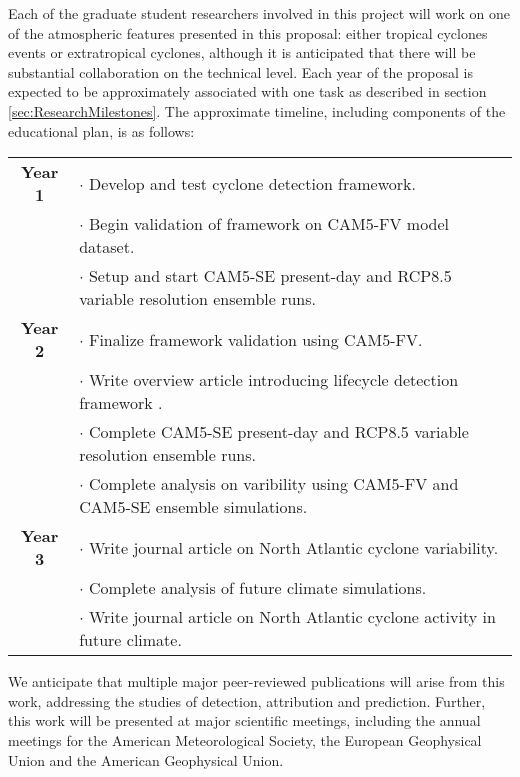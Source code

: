 \documentclass[11pt]{article}
\begin{document}
Each of the graduate student researchers involved in this project will work on one of the atmospheric features presented in this proposal: either tropical cyclones events or extratropical cyclones, although it is anticipated that there will be substantial collaboration on the technical level.  Each year of the proposal is expected to be approximately associated with one task as described in section \ref{sec:ResearchMilestones}.  The approximate timeline, including components of the educational plan, is as follows:

\begin{tabularx}{\textwidth}{cX}
\hline
\textbf{Year 1} & $\cdot$ Develop and test cyclone detection framework. \\
& $\cdot$ Begin validation of framework on CAM5-FV model dataset.  \\
& $\cdot$ Setup and start CAM5-SE present-day and RCP8.5 variable resolution ensemble runs. \\
\hline
\textbf{Year 2} & $\cdot$ Finalize framework validation using CAM5-FV. \\
& $\cdot$ Write overview article introducing lifecycle detection framework .\\
& $\cdot$ Complete CAM5-SE present-day and RCP8.5 variable resolution ensemble runs. \\
& $\cdot$ Complete analysis on varibility using CAM5-FV and CAM5-SE ensemble simulations. \\
\hline
\textbf{Year 3} & $\cdot$ Write journal article on North Atlantic cyclone variability. \\
& $\cdot$ Complete analysis of future climate simulations. \\
& $\cdot$ Write journal article on North Atlantic cyclone activity in future climate. \\
\hline
\end{tabularx}

We anticipate that multiple major peer-reviewed publications will arise from this work, addressing the studies of detection, attribution and prediction. Further, this work will be presented at major scientific meetings, including the annual meetings for the American Meteorological Society, the European Geophysical Union and the American Geophysical Union.

{\vbox{}}

\end{document}
